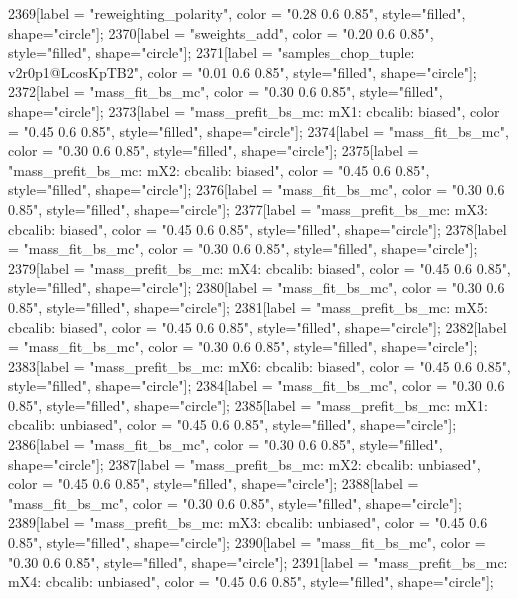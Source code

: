 {	2369[label = "reweighting_polarity", color = "0.28 0.6 0.85", style="filled", shape="circle"];
	2370[label = "sweights_add", color = "0.20 0.6 0.85", style="filled", shape="circle"];
	2371[label = "samples_chop_tuple\nversion: v2r0p1@LcosKpTB2", color = "0.01 0.6 0.85", style="filled", shape="circle"];
	2372[label = "mass_fit_bs_mc", color = "0.30 0.6 0.85", style="filled", shape="circle"];
	2373[label = "mass_prefit_bs_mc\nmassbin: mX1\nmassmodel: cbcalib\ntrigger: biased", color = "0.45 0.6 0.85", style="filled", shape="circle"];
	2374[label = "mass_fit_bs_mc", color = "0.30 0.6 0.85", style="filled", shape="circle"];
	2375[label = "mass_prefit_bs_mc\nmassbin: mX2\nmassmodel: cbcalib\ntrigger: biased", color = "0.45 0.6 0.85", style="filled", shape="circle"];
	2376[label = "mass_fit_bs_mc", color = "0.30 0.6 0.85", style="filled", shape="circle"];
	2377[label = "mass_prefit_bs_mc\nmassbin: mX3\nmassmodel: cbcalib\ntrigger: biased", color = "0.45 0.6 0.85", style="filled", shape="circle"];
	2378[label = "mass_fit_bs_mc", color = "0.30 0.6 0.85", style="filled", shape="circle"];
	2379[label = "mass_prefit_bs_mc\nmassbin: mX4\nmassmodel: cbcalib\ntrigger: biased", color = "0.45 0.6 0.85", style="filled", shape="circle"];
	2380[label = "mass_fit_bs_mc", color = "0.30 0.6 0.85", style="filled", shape="circle"];
	2381[label = "mass_prefit_bs_mc\nmassbin: mX5\nmassmodel: cbcalib\ntrigger: biased", color = "0.45 0.6 0.85", style="filled", shape="circle"];
	2382[label = "mass_fit_bs_mc", color = "0.30 0.6 0.85", style="filled", shape="circle"];
	2383[label = "mass_prefit_bs_mc\nmassbin: mX6\nmassmodel: cbcalib\ntrigger: biased", color = "0.45 0.6 0.85", style="filled", shape="circle"];
	2384[label = "mass_fit_bs_mc", color = "0.30 0.6 0.85", style="filled", shape="circle"];
	2385[label = "mass_prefit_bs_mc\nmassbin: mX1\nmassmodel: cbcalib\ntrigger: unbiased", color = "0.45 0.6 0.85", style="filled", shape="circle"];
	2386[label = "mass_fit_bs_mc", color = "0.30 0.6 0.85", style="filled", shape="circle"];
	2387[label = "mass_prefit_bs_mc\nmassbin: mX2\nmassmodel: cbcalib\ntrigger: unbiased", color = "0.45 0.6 0.85", style="filled", shape="circle"];
	2388[label = "mass_fit_bs_mc", color = "0.30 0.6 0.85", style="filled", shape="circle"];
	2389[label = "mass_prefit_bs_mc\nmassbin: mX3\nmassmodel: cbcalib\ntrigger: unbiased", color = "0.45 0.6 0.85", style="filled", shape="circle"];
	2390[label = "mass_fit_bs_mc", color = "0.30 0.6 0.85", style="filled", shape="circle"];
	2391[label = "mass_prefit_bs_mc\nmassbin: mX4\nmassmodel: cbcalib\ntrigger: unbiased", color = "0.45 0.6 0.85", style="filled", shape="circle"];
}
